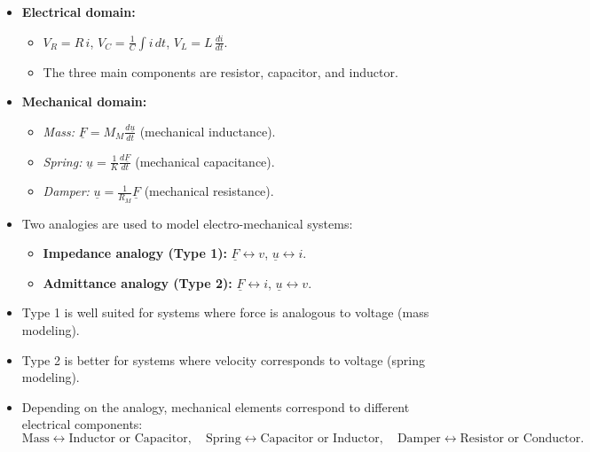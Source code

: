 \begin{tcolorbox}[colback=gray!10!white,colframe=black,title=\textbf{Summary – Electrical and Mechanical Domains}]
\begin{itemize}
    \item \textbf{Electrical domain:}
    \begin{itemize}
        \item $V_R = R\,i$, \quad $V_C = \frac{1}{C}\int i\,dt$, \quad $V_L = L\,\frac{di}{dt}$.
        \item The three main components are resistor, capacitor, and inductor.
    \end{itemize}
    \item \textbf{Mechanical domain:}
    \begin{itemize}
        \item \textit{Mass:} $\underline{F} = M_M \frac{d\underline{u}}{dt}$ (mechanical inductance).
        \item \textit{Spring:} $\underline{u} = \frac{1}{K} \frac{d\underline{F}}{dt}$ (mechanical capacitance).
        \item \textit{Damper:} $\underline{u} = \frac{1}{R_M} \underline{F}$ (mechanical resistance).
    \end{itemize}
\end{itemize}
\end{tcolorbox}


\begin{tcolorbox}[colback=gray!10!white,colframe=black,title=\textbf{Summary – Analogy Theory}]
\begin{itemize}
    \item Two analogies are used to model electro-mechanical systems:
    \begin{itemize}
        \item \textbf{Impedance analogy (Type 1):} $\underline{F} \leftrightarrow v$, $\underline{u} \leftrightarrow i$.
        \item \textbf{Admittance analogy (Type 2):} $\underline{F} \leftrightarrow i$, $\underline{u} \leftrightarrow v$.
    \end{itemize}
    \item Type 1 is well suited for systems where force is analogous to voltage (mass modeling).
    \item Type 2 is better for systems where velocity corresponds to voltage (spring modeling).
    \item Depending on the analogy, mechanical elements correspond to different electrical components:
    \[
    \text{Mass} \leftrightarrow \text{Inductor or Capacitor}, \quad
    \text{Spring} \leftrightarrow \text{Capacitor or Inductor}, \quad
    \text{Damper} \leftrightarrow \text{Resistor or Conductor}.
    \]
\end{itemize}
\end{tcolorbox}


